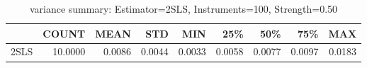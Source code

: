 \begin{table}[ht]
\centering
\caption{variance summary: Estimator=2SLS, Instruments=100, Strength=0.50}
\begin{tabular}{lrrrrrrrr}
\toprule
 & COUNT & MEAN & STD & MIN & 25\% & 50\% & 75\% & MAX \\
\midrule
2SLS & 10.0000 & 0.0086 & 0.0044 & 0.0033 & 0.0058 & 0.0077 & 0.0097 & 0.0183 \\
\bottomrule
\end{tabular}
\end{table}
